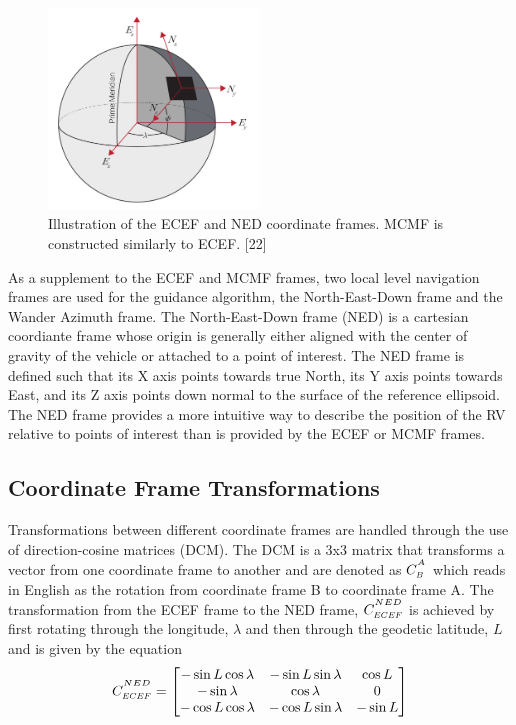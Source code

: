 \documentclass[12pt]{article}
\numberwithin{equation}{section}
\numberwithin{figure}{section}
\numberwithin{table}{section}
\begin{document}
\begin{figure}[h]
  \centering
  \includegraphics[width=0.5\textwidth]{Figures/ref_ecef.jpg}
  \caption{Illustration of the ECEF and NED coordinate frames. MCMF is constructed similarly to ECEF. [22]}
  \label{fig:ECEF}
\end{figure}

As a supplement to the ECEF and MCMF frames, two local level navigation frames are used for the guidance algorithm, the North-East-Down frame and the Wander Azimuth frame. The North-East-Down frame (NED) is a cartesian coordiante frame whose origin is generally either aligned with the center of gravity of the vehicle or attached to a point of interest. The NED frame is defined such that its X axis points towards true North, its Y axis points towards East, and its Z axis points down normal to the surface of the reference ellipsoid. The NED frame provides a more intuitive way to describe the position of the RV relative to points of interest than is provided by the ECEF or MCMF frames.


\subsection{Coordinate Frame Transformations}
Transformations between different coordinate frames are handled through the use of direction-cosine matrices (DCM). The DCM is a 3x3 matrix that transforms a vector from one coordinate frame to another and are denoted as $C^{^{\scaleto{A}{4pt}}}_{\scaleto{B}{4pt}}$ which reads in English as the rotation from coordinate frame B to coordinate frame A.
The transformation from the ECEF frame to the NED frame, $C^{^{\scaleto{NED}{4pt}}}_{\scaleto{ECEF}{4pt}}$ is achieved by first rotating through the longitude, $\lambda$ and then through the geodetic latitude, $L$ and is given by the equation
\begin{align}
  C^{^{\scaleto{NED}{4pt}}}_{\scaleto{ECEF}{4pt}} = \begin{bmatrix}
    -\sin L \cos {\lambda} & -\sin L \sin {\lambda} & \cos L \\
    -\sin {\lambda} & \cos {\lambda} & 0 \\
    -\cos L \cos {\lambda} & -\cos L \sin {\lambda} & -\sin L
  \end{bmatrix}
\end{align}
\end{document}
